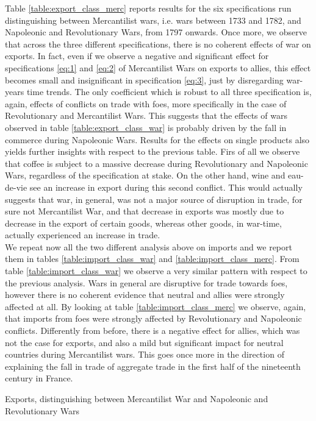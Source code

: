 \documentclass[12pt,a4paper,notitlepage,english]{article}
\begin{document}
Table \ref{table:export_class_merc} reports results for the six specifications run distinguishing between Mercantilist wars, i.e. wars between 1733 and 1782, and Napoleonic and Revolutionary Wars, from 1797 onwards. Once more, we observe that across the three different specifications, there is no coherent effects of war on exports. In fact, even if we observe a negative and significant effect for specifications \ref{eq:1} and \ref{eq:2} of Mercantilist Wars on exports to allies, this effect becomes small and insignificant in specification \ref{eq:3}, just by disregarding war-years time trends. The only coefficient which is robust to all three specification is, again, effects of conflicts on trade with foes, more specifically in the case of Revolutionary and Mercantilist Wars. This suggests that the effects of wars observed in table \ref{table:export_class_war} is probably driven by the fall in commerce during Napoleonic Wars. Results for the effects on single products also yields further insights with respect to the previous table. Firs of all we observe that coffee is subject to a massive decrease during Revolutionary and  Napoleonic Wars, regardless of the specification at stake. On the other hand, wine and eau-de-vie see an increase in export during this second conflict. This would actually suggests that war, in general, was not a major source of disruption in trade, for sure not Mercantilist War, and that decrease in exports was mostly due to decrease in the export of certain goods, whereas other goods, in war-time, actually experienced an increase in trade.\\
We repeat now all the two different analysis above on imports and we report them in tables \ref{table:import_class_war} and \ref{table:import_class_merc}. From table \ref{table:import_class_war} we observe a very similar pattern with respect to the previous analysis. Wars in general are disruptive for trade towards foes, however there is no coherent evidence that neutral and allies were strongly affected at all. By looking at table \ref{table:import_class_merc} we observe, again, that imports from foes were strongly affected by Revolutionary and Napoleonic conflicts. Differently from before, there is a negative effect for allies, which was not the case for exports, and also a mild but significant impact for neutral countries during Mercantilist wars. This goes once more in the direction of explaining the fall in trade of aggregate trade in the first half of the nineteenth century in France. 
\begin{table}
\begin{center}
\caption {Exports, distinguishing between Mercantilist War and Napoleonic and Revolutionary Wars} \label{table:export_class_merc}
\renewcommand{\arraystretch}{0.6}

\end{center}
\end{table}
\end{document}
